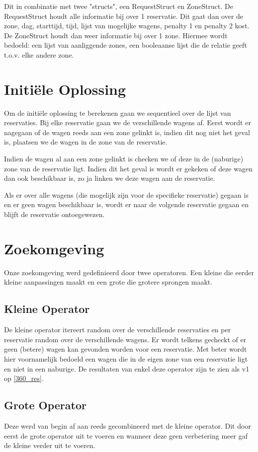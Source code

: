 \documentclass[a4paper, 12pt, one column]{article}
\begin{document}
Dit in combinatie met twee "structs", een RequestStruct en ZoneStruct. De RequestStruct houdt alle informatie bij over 1 reservatie. Dit gaat dan over de zone, dag, starttijd, tijd, lijst van mogelijke wagens, penalty 1 en penalty 2 kost. De ZoneStruct houdt dan weer informatie bij over 1 zone. Hiermee wordt bedoeld: een lijst van aanliggende zones, een booleaanse lijst die de relatie geeft t.o.v. elke andere zone.


\section{Initiële Oplossing}
Om de initiële oplossing te berekenen gaan we sequentieel over de lijst van reservaties. Bij elke reservatie gaan we de verschillende wagens af. Eerst wordt er nagegaan of de wagen reeds aan een zone gelinkt is, indien dit nog niet het geval is, plaatsen we de wagen in de zone van de reservatie. 

Indien de wagen al aan een zone gelinkt is checken we of deze in de (naburige) zone van de reservatie ligt. Indien dit het geval is wordt er gekeken of deze wagen dan ook beschikbaar is, zo ja linken we deze wagen aan de reservatie.

Als er over alle wagens (die mogelijk zijn voor de specifieke reservatie) gegaan is en er geen wagen beschikbaar is, wordt er naar de volgende reservatie gegaan en blijft de reservatie ontoegewezen.

\section{Zoekomgeving}
Onze zoekomgeving werd gedefinieerd door twee operatoren. Een kleine die eerder kleine aanpassingen maakt en een grote die grotere sprongen maakt.

\subsection{Kleine Operator}
De kleine operator itereert random over de verschillende reservaties en per reservatie random over de verschillende wagens. Er wordt telkens gecheckt of er geen (betere) wagen kan gevonden worden voor een reservatie. Met beter wordt hier voornamelijk bedoeld een wagen die in de eigen zone van een reservatie ligt en niet in een naburige. De resultaten van enkel deze operator zijn te zien als v1 op \ref{360_res}.

\subsection{Grote Operator}
Deze werd van begin af aan reeds gecombineerd met de kleine operator. Dit door eerst de grote operator uit te voeren en wanneer deze geen verbetering meer gaf de kleine verder uit te voeren.
\end{document}
